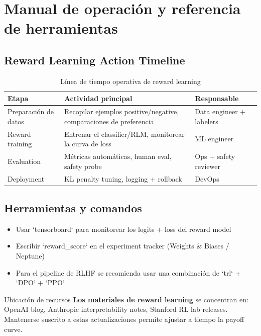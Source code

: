 \section{Manual de operación y referencia de herramientas}

\subsection{Reward Learning Action Timeline}

\begin{table}[H]
\centering
\begin{tabular}{p{} p{} p{}}
\toprule
Etapa & Actividad principal & Responsable \\
\midrule
Preparación de datos & Recopilar ejemplos positive/negative, comparaciones de preferencia & Data engineer + labelers \\
Reward training & Entrenar el classifier/RLM, monitorear la curva de loss & ML engineer \\
Evaluation & Métricas automáticas, human eval, safety probe & Ops + safety reviewer \\
Deployment & KL penalty tuning, logging + rollback & DevOps \\
\bottomrule
\end{tabular}
\caption{Línea de tiempo operativa de reward learning}
\end{table}

\subsection{Herramientas y comandos}

\begin{itemize}
    \item Usar `tensorboard` para monitorear los logits + loss del reward model
    \item Escribir `reward_score` en el experiment tracker (Weights \& Biases / Neptune)
    \item Para el pipeline de RLHF se recomienda usar una combinación de `trl` + `DPO` + `PPO`
\end{itemize}

\begin{knowledgebox}{Ubicación de recursos}
\textbf{Los materiales de reward learning} se concentran en: OpenAI blog, Anthropic interpretability notes, Stanford RL lab releases. Mantenerse suscrito a estas actualizaciones permite ajustar a tiempo la payoff curve.
\end{knowledgebox}

